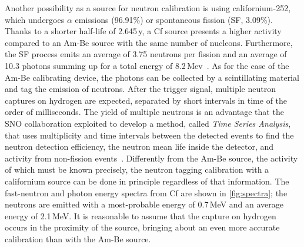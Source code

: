 Another possibility as a source for neutron calibration is using californium-252, which %
undergoes $\alpha$ emissions (96.91\%) or spontaneous fission (SF, 3.09\%).
Thanks to a shorter half-life of 2.645\,y, a Cf source presents a higher activity compared to an Am-Be source %
with the same number of nucleons.
Furthermore, the SF process emits an average of 3.75 neutrons per fission and an average of 10.3 photons %
summing up for a total energy of 8.2\,Mev~\cite{PhysRev.104.699}.
As for the case of the Am-Be calibrating device, the photons can be collected by a scintillating material %
and tag the emission of neutrons.
After the trigger signal, multiple neutron captures on hydrogen are expected, separated by short intervals in time %
of the order of milliseconds.
The yield of multiple neutrons is an advantage that the SNO collaboration exploited to develop a method, %
called \emph{Time Series Analysis}, that uses multiplicity and time intervals between the detected events %
to find the neutron detection efficiency, the neutron mean life inside the detector, %
and activity from non-fission events~\cite{Labranche:2004sya}.
Differently from the Am-Be source, the activity of which must be known precisely, the neutron tagging calibration %
with a californium source can be done in principle regardless of that information.
The fast-neutron and photon energy spectra from Cf are shown in \ref{fig:spectra}; %
the neutrons are emitted with a most-probable energy of 0.7\,MeV and an average energy of 2.1\,MeV.
It is reasonable to assume that the capture on hydrogen occurs in the proximity of the source, %
bringing about an even more accurate calibration than with the Am-Be source.


